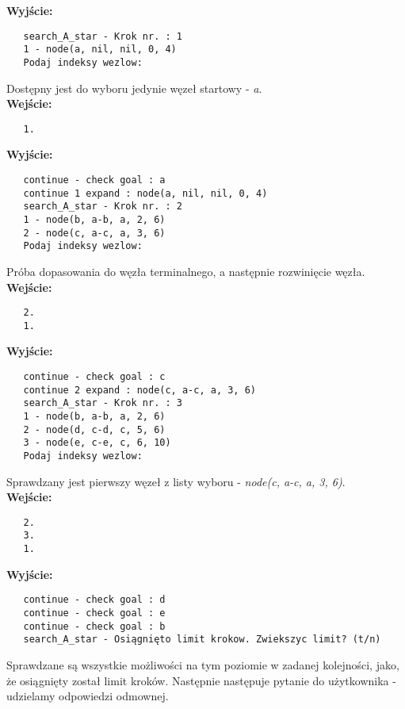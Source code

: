 \documentclass[11pt]{article} %
\begin{document}
\textbf{Wyjście:}
\begin{verbatim}
   search_A_star - Krok nr. : 1
   1 - node(a, nil, nil, 0, 4)
   Podaj indeksy wezlow:
\end{verbatim}
Dostępny jest do wyboru jedynie węzeł startowy - \textit{a}.\\
\textbf{Wejście:}
\begin{verbatim}
   1.
\end{verbatim}
\textbf{Wyjście:}
\begin{verbatim}
   continue - check goal : a
   continue 1 expand : node(a, nil, nil, 0, 4)
   search_A_star - Krok nr. : 2
   1 - node(b, a-b, a, 2, 6)
   2 - node(c, a-c, a, 3, 6)
   Podaj indeksy wezlow:
\end{verbatim}
Próba dopasowania do węzła terminalnego, a następnie rozwinięcie węzła.\\
\textbf{Wejście:}
\begin{verbatim}
   2.
   1.
\end{verbatim}
\textbf{Wyjście:}
\begin{verbatim}
   continue - check goal : c
   continue 2 expand : node(c, a-c, a, 3, 6)
   search_A_star - Krok nr. : 3
   1 - node(b, a-b, a, 2, 6)
   2 - node(d, c-d, c, 5, 6)
   3 - node(e, c-e, c, 6, 10)
   Podaj indeksy wezlow:
\end{verbatim}
Sprawdzany jest pierwszy węzeł z listy wyboru - \textit{node(c, a-c, a, 3, 6)}.\\
\textbf{Wejście:}
\begin{verbatim}
   2.
   3.
   1.
\end{verbatim}
\textbf{Wyjście:}
\begin{verbatim}
   continue - check goal : d
   continue - check goal : e
   continue - check goal : b
   search_A_star - Osiągnięto limit krokow. Zwiekszyc limit? (t/n)
\end{verbatim}
Sprawdzane są wszystkie możliwości na tym poziomie w zadanej kolejności, jako, że osiągnięty został limit kroków. Następnie następuje pytanie do użytkownika - udzielamy odpowiedzi odmownej.\\

\clearpage
\end{document}
